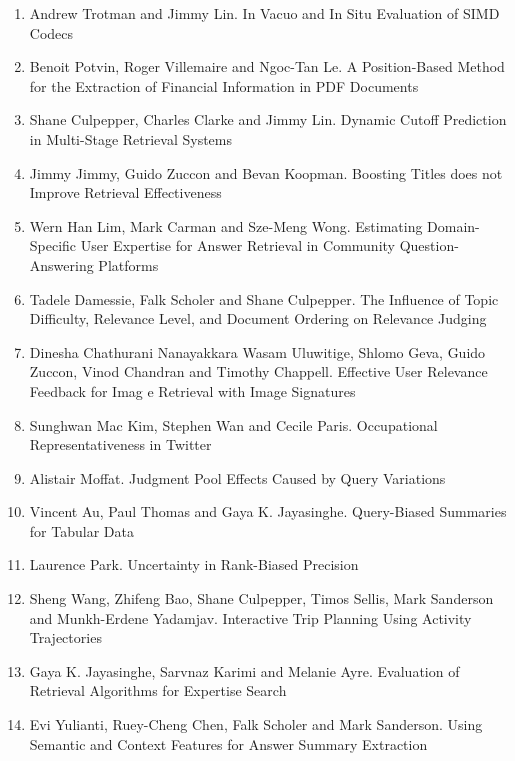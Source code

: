 \documentclass[a4paper]{article}
\begin{document}
\begin{enumerate}
\item Andrew Trotman and Jimmy Lin. In Vacuo and In Situ Evaluation of SIMD Codecs
    
\item Benoit Potvin, Roger Villemaire and Ngoc-Tan Le. A Position-Based Method for the Extraction of Financial Information in PDF Documents

\item Shane Culpepper, Charles Clarke and Jimmy Lin. Dynamic Cutoff Prediction in Multi-Stage Retrieval Systems

\item Jimmy Jimmy, Guido Zuccon and Bevan Koopman. Boosting Titles does not Improve Retrieval Effectiveness

\item Wern Han Lim, Mark Carman and Sze-Meng Wong. Estimating Domain-Specific User Expertise for Answer Retrieval in Community Question-Answering Platforms

\item Tadele Damessie, Falk Scholer and Shane Culpepper. The Influence of Topic Difficulty, Relevance Level, and Document Ordering on Relevance Judging

\item Dinesha Chathurani Nanayakkara Wasam Uluwitige, Shlomo Geva, Guido Zuccon, Vinod Chandran and Timothy Chappell. Effective User Relevance Feedback for Imag e Retrieval with Image Signatures 

\item Sunghwan Mac Kim, Stephen Wan and Cecile Paris. Occupational Representativeness in Twitter

\item Alistair Moffat. Judgment Pool Effects Caused by Query Variations

\item Vincent Au, Paul Thomas and Gaya K. Jayasinghe. Query-Biased Summaries for Tabular Data

\item Laurence Park. Uncertainty in Rank-Biased Precision

\item Sheng Wang, Zhifeng Bao, Shane Culpepper, Timos Sellis, Mark Sanderson and Munkh-Erdene Yadamjav. Interactive Trip Planning Using Activity Trajectories

\item Gaya K. Jayasinghe, Sarvnaz Karimi and Melanie Ayre. Evaluation of Retrieval Algorithms for Expertise Search 

\item Evi Yulianti, Ruey-Cheng Chen, Falk Scholer and Mark Sanderson. Using Semantic and Context Features for Answer Summary Extraction

\end{enumerate}
\end{document}
